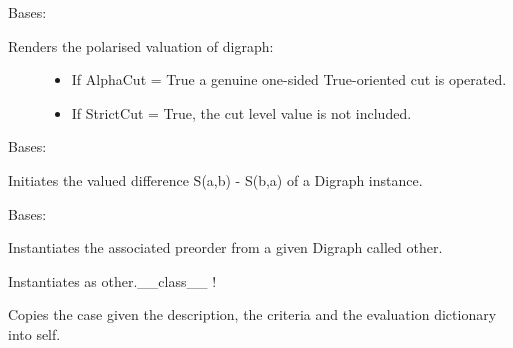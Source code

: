 \documentclass[letterpaper,10pt,english]{sphinxmanual}
\begin{document}

\begin{fulllineitems}
\label{techDoc:digraphs.PolarisedDigraph}
Bases: {\hyperref[techDoc:digraphs.Digraph]{}}
\begin{description}
\item[{Renders the polarised valuation of digraph:}] \leavevmode\begin{itemize}
\item {} 
If AlphaCut = True a genuine one-sided True-oriented cut is operated.

\item {} 
If StrictCut = True, the cut level value is not included.

\end{itemize}

\end{description}

\end{fulllineitems}


\begin{fulllineitems}
\label{techDoc:digraphs.PreferenceDigraph}
Bases: {\hyperref[techDoc:digraphs.Digraph]{}}

Initiates the valued difference S(a,b) - S(b,a) of a Digraph instance.

\end{fulllineitems}


\begin{fulllineitems}
\label{techDoc:digraphs.Preorder}
Bases: {\hyperref[techDoc:digraphs.Digraph]{}}

Instantiates the associated preorder from
a given Digraph called other.

Instantiates as other.\_\_class\_\_ !

Copies the case given the description, the criteria
and the evaluation dictionary into self.

\end{fulllineitems}
\end{document}
